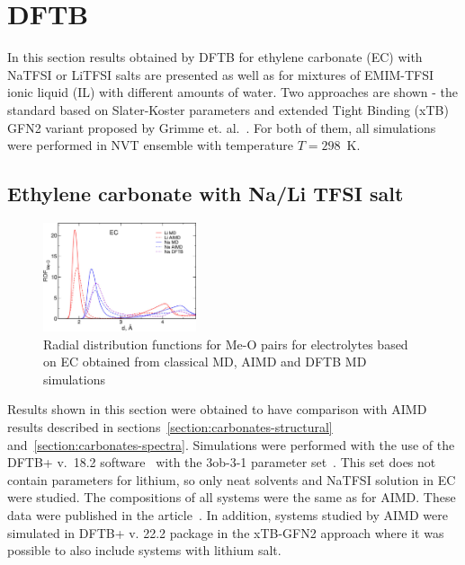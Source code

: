 \section{DFTB}

In this section results obtained by DFTB for ethylene carbonate (EC) with NaTFSI or LiTFSI salts are presented as well as for mixtures of EMIM-TFSI ionic liquid (IL) with different amounts of water. Two approaches are shown - the standard based on Slater-Koster parameters and extended Tight Binding (xTB) GFN2 variant proposed by Grimme et. al.~\cite{gfn-2}. For both of them, all simulations were performed in NVT ensemble with temperature $T = 298$~K.

\subsection{Ethylene carbonate with Na/Li TFSI salt}

\begin{figure}[ht]
    \centering
    \includegraphics[width=0.4\textwidth]{img/5-alternatives-to-aimd/1-carbonates/rdf.png}
    \singlespacing
    \caption{Radial distribution functions for Me-O pairs for electrolytes based on EC obtained from classical MD, AIMD and DFTB MD simulations}
    \label{fig:dftb-carbonates-rdf}
\end{figure}

Results shown in this section were obtained to have comparison with AIMD results described in sections~\ref{section:carbonates-structural} and~\ref{section:carbonates-spectra}. Simulations were performed with the use of the DFTB+ v.~18.2 software~\cite{dftb-plus} with the 3ob-3-1 parameter set~\cite{3ob-1,3ob-2,3ob-3,3ob-4}. This set does not contain parameters for lithium, so only neat solvents and NaTFSI solution in EC were studied. The compositions of all systems were the same as for AIMD. These data were published in the article~\cite{carbonates}. In addition, systems studied by AIMD were simulated in DFTB+ v. 22.2 package in the xTB-GFN2 approach where it was possible to also include systems with lithium salt.

